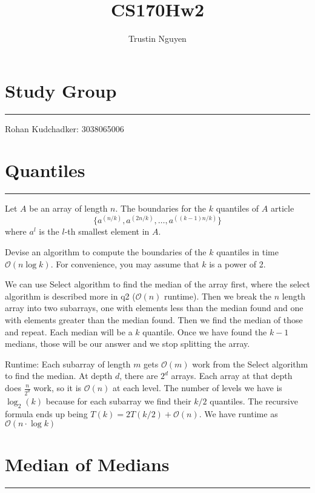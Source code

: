 \documentclass{article}
\title{CS170Hw2}
\author{Trustin Nguyen}
\begin{document}
    \maketitle

\reversemarginpar

\section*{Study Group}
\hrule
Rohan Kudchadker: 3038065006


\newpage
\section*{Quantiles}
\hrule

Let $A$ be an array of length $n$. The boundaries for the $k$ quantiles of $A$ article  
    \begin{equation*}
        \{a^{(n / k)}, a^{(2n / k)}, \ldots, a^{((k - 1)n / k)}\}
    \end{equation*}
where $a^{l}$ is the $l$-th smallest element in $A$.

Devise an algorithm to compute the boundaries of the $k$ quantiles in time $\mathcal{O}(n \log{k})$. For convenience, you may assume that $k$ is a power of 2.
    \begin{answer}
        We can use Select algorithm to find the median of the array first, where the select algorithm is described more in q2 ($\mathcal{O}(n)$ runtime). Then we break the $n$ length array into two subarrays, one with elements less than the median found and one with elements greater than the median found. Then we find the median of those and repeat. Each median will be a $k$ quantile. Once we have found the $k - 1$ medians, those will be our answer and we stop splitting the array. 

        Runtime: Each subarray of length $m$ gets $\mathcal{O}(m)$ work from the Select algorithm to find the median. At depth $d$, there are $2^{d}$ arrays. Each array at that depth does $\frac{n}{2^{d}}$ work, so it is $\mathcal{O}(n)$ at each level. The number of levels we have is $\log_{2}(k)$ because for each subarray we find their $k / 2$ quantiles. The recursive formula ends up being $T(k) = 2T(k / 2) + \mathcal{O}(n)$. We have runtime as $\mathcal{O}(n \cdot \log{k})$
    \end{answer}

\newpage
\section*{Median of Medians}
\hrule
\end{document}
